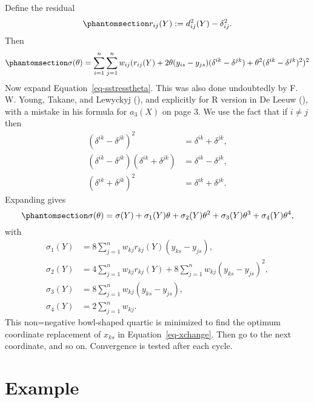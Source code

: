 \documentclass[
  12pt,
  letterpaper,
  DIV=11,
  numbers=noendperiod]{scrartcl}
\newcommand{\sectionbreak}{\clearpage}
\begin{document}
Define the residual
\begin{equation}\phantomsection\label{eq-sstressresidual}{
r_{ij}(Y):=d_{ij}^2(Y)-\delta_{ij}^2.
}\end{equation} Then
\begin{equation}\phantomsection\label{eq-sstresstheta}{
\sigma(\theta)=
\sum_{i=1}^n\sum_{j=1}^nw_{ij}(r_{ij}(Y)+2\theta(y_{is}-y_{js})(\delta^{ik}-\delta^{jk})+\theta^2(\delta^{ik}-\delta^{jk})^2)^2
}\end{equation} Now expand Equation~\ref{eq-sstresstheta}. This was also
done undoubtedly by F. W. Young, Takane, and Lewyckyj
(), and explicitly for R
version in De Leeuw (), with a mistake
in his formula for \(a_3(X)\) on page 3. We use the fact that if
\(i\not= j\) then \begin{subequations}
\begin{align}
(\delta^{ik}-\delta^{jk})^2&=\delta^{ik}+\delta^{jk},\\
(\delta^{ik}-\delta^{jk})(\delta^{ik}+\delta^{jk})&=\delta^{ik}-\delta^{jk},\\
(\delta^{ik}+\delta^{jk})^2&=\delta^{ik}+\delta^{jk}.
\end{align}
\end{subequations} Expanding gives
\begin{equation}\phantomsection\label{eq-sigmaexpansion}{
\sigma(\theta)=\sigma(Y)+\sigma_1(Y)\theta+\sigma_2(Y)\theta^2+\sigma_3(Y)\theta^3+\sigma_4(Y)\theta^4,
}\end{equation} with \begin{subequations}
\begin{align}
\sigma_1(Y)&=8\sum_{j=1}^nw_{kj}r_{kj}(Y)(y_{ks}-y_{js}),\\
\sigma_2(Y)&=4\sum_{j=1}^nw_{kj}r_{kj}(Y)+
8\sum_{j=1}^nw_{kj}(y_{ks}-y_{js})^2,\\
\sigma_3(Y)&=8\sum_{j=1}^nw_{kj}(y_{ks}-y_{js}),\\
\sigma_4(Y)&=2\sum_{j=1}^nw_{kj}.
\end{align}
\end{subequations} This non=negative bowl-shaped quartic is minimized to
find the optimum coordinate replacement of \(x_{ks}\) in
Equation~\ref{eq-xchange}. Then go to the next coordinate, and so on.
Convergence is tested after each cycle.

\sectionbreak

\section{Example}\label{example}
\end{document}
